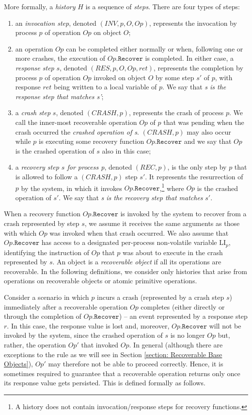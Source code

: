More formally, a \textit{history} $H$ is a sequence of \emph{steps}. There are four types of steps:
\begin{enumerate}
	\item an \emph{invocation step}, denoted $(INV, p, O, Op)$, represents the invocation by process $p$ of operation $Op$ on object $O$;
	\item an operation $Op$ can be completed either normally or when, following one or more crashes, the execution of $Op.\texttt{Recover}$ is completed. In either case, a \emph{response step} $s$, denoted $(RES, p, O, Op, ret)$, represents the completion by process $p$ of operation $Op$ invoked on object $O$ by some step $s'$ of $p$, with response $ret$ being written to a local variable of $p$. We say that \emph{s is the response step that matches s'};
	\item a \emph{crash step} $s$, denoted $(CRASH, p)$, represents the crash of process $p$. We call the inner-most recoverable operation $Op$ of $p$ that was pending when the crash occurred the \emph{crashed operation of s}. $(CRASH, p)$ may also occur while $p$ is executing some recovery function $Op.\texttt{Recover}$ and we say that $Op$ is the crashed operation of $s$ also in this case;
	\item a \emph{recovery step $s$ for process p}, denoted $(REC, p)$, is the only step by $p$ that is allowed to follow a $(CRASH, p)$ step $s'$. It represents the resurrection of $p$ by the system, in which it invokes $Op.\texttt{Recover}$,\footnote{A history does not contain invocation/response steps for recovery functions.} where $Op$ is the crashed operation of $s'$.
We say that \emph{s is the recovery step that matches} $s'$.
\end{enumerate}

When a recovery function $Op.\texttt{Recover}$ is invoked by the system to recover from a crash represented by step $s$, we assume it receives the same arguments as those with which $Op$ was invoked when that crash occurred. We also assume that $Op.\texttt{Recover}$ has access to a designated per-process non-volatile variable $\text{LI}_p$, identifying the instruction of $Op$ that $p$ was about to execute in the crash represented by $s$. An object is a \emph{recoverable object} if all its operations are recoverable. In the following definitions, we consider only histories that arise from operations on recoverable objects or atomic primitive operations.

Consider a scenario in which $p$ incurs a crash (represented by a crash step $s$) immediately after a recoverable operation $Op$ completes (either directly or through the completion of  $Op.\texttt{Recover}$) -- an event represented by a response step $r$. In this case, the response value is lost and, moreover, $Op.\texttt{Recover}$ will not be invoked by the system, since the crashed operation of $s$ is no longer $Op$ but, rather, the operation $Op'$ that invoked $Op$. In general (although there are exceptions to the rule as we will see in Section \ref{section: Recoverable Base Objects}), $Op'$ may therefore not be able to proceed correctly. Hence, it is sometimes required to guarantee that a recoverable operation returns only once its response value gets persisted. This is defined formally as follows.

